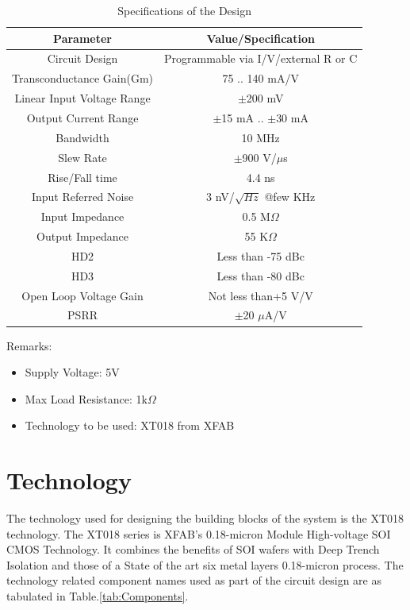 \begin{table} [H]
\centering
\begin{tabular}{@{}cc@{}}
\toprule
Parameter						& Value/Specification		\\ \midrule
Circuit Design					& Programmable via I/V/external R or C			\\
Transconductance Gain(Gm)		& 75 .. 140 mA/V			\\
Linear Input Voltage Range		& $\pm$200 mV				\\
Output Current Range			& $\pm$15 mA .. $\pm$30 mA	\\
Bandwidth						& 10 MHz					\\
Slew Rate						& $\pm$900 V/$\mu$s			\\
Rise/Fall time					& 4.4 ns					\\
Input Referred Noise			& 3 nV/$\sqrt{Hz}$ @few KHz	\\
Input Impedance					& 0.5 M$\Omega$				\\
Output Impedance				& 55 K$\Omega$				\\
HD2								& Less than -75 dBc			\\
HD3								& Less than -80 dBc			\\
Open Loop Voltage Gain			& Not less than+5 V/V		\\
PSRR							& $\pm$20 $\mu$A/V			\\
\bottomrule
\end{tabular}
\caption{Specifications of the Design}
\label{tab:Specs}
\end{table}

Remarks:
\begin{itemize}
\item Supply Voltage: 5V
\item Max Load Resistance: 1k$\Omega$
\item Technology to be used: XT018 from XFAB
\end{itemize}

\vfill
\clearpage

\section{Technology}

The technology used for designing the building blocks of the system is the XT018 technology. The XT018 series is XFAB's 0.18-micron Module High-voltage SOI CMOS Technology. It combines the benefits of SOI wafers with Deep Trench Isolation and those of a State of the art six metal layers 0.18-micron process\cite{xt018}. The technology related component names used as part of the circuit design are as tabulated in Table.\ref{tab:Components}.

